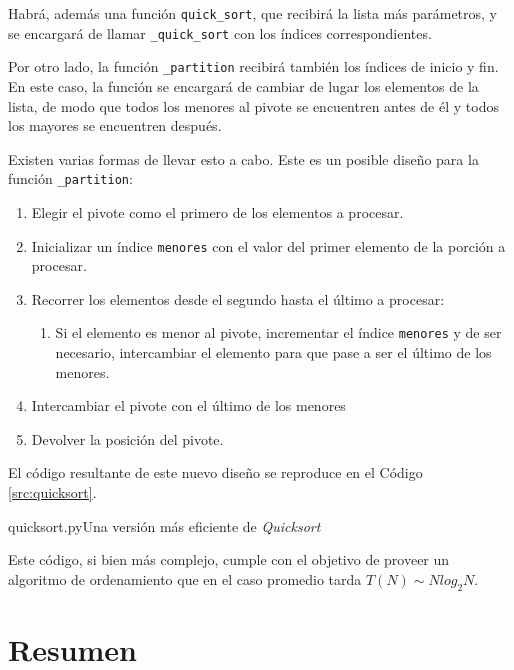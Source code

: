 Habrá, además una función \lstinline!quick_sort!, que recibirá la lista más
parámetros, y se encargará de llamar \lstinline!_quick_sort! con los
índices correspondientes.

Por otro lado, la función \lstinline!_partition! recibirá también los
índices de inicio y fin.  En este caso, la función se encargará de cambiar
de lugar los elementos de la lista, de modo que todos los menores al pivote
se encuentren antes de él y todos los mayores se encuentren después.

Existen varias formas de llevar esto a cabo.  Este es un posible diseño
para la función \lstinline!_partition!:

\begin{enumerate}
\item Elegir el pivote como el primero de los elementos a procesar.
\item Inicializar un índice \lstinline!menores! con el valor del primer
elemento de la porción a procesar.
\item Recorrer los elementos desde el segundo hasta el último a procesar:
\begin{enumerate}
\item Si el elemento es menor al pivote, incrementar el índice
\lstinline!menores! y de ser necesario, intercambiar el elemento para que
pase a ser el último de los menores.
\end{enumerate}
\item Intercambiar el pivote con el último de los menores
\item Devolver la posición del pivote.
\end{enumerate}

El código resultante de este nuevo diseño se reproduce en el Código
\ref{src:quicksort}.

\begin{codigo}{quicksort.py}{Una versión más eficiente de {\it Quicksort}}

\label{src:quicksort}
\end{codigo}

Este código, si bien más complejo, cumple con el objetivo de proveer un
algoritmo de ordenamiento que en el caso promedio tarda
$T(N) \sim N log_2 N$.

\section{Resumen}

